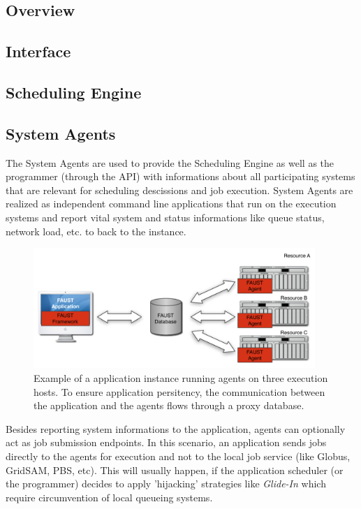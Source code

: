 \subsection{Overview}

\subsection{Interface}

\subsection{Scheduling Engine}

\subsection{System Agents}

The System Agents are used to provide the Scheduling Engine as well as the programmer (through the API) with informations about all participating systems that are relevant for scheduling descissions and job execution. \FAUST System Agents are realized as independent command line applications that run on the execution systems and report vital system and status informations like queue status, network load, etc. to back to the \FAUST instance.

\begin{figure}[bth!]
  \begin{center}
    \includegraphics[width=0.95\textwidth]{figures/faust_agents_01}
    \caption{\label{fig:faust_agents_01} Example of a \FAUST application 
      instance running agents on three execution hosts. To ensure 
      application persitency, the communication between the application
      and the agents flows through a proxy database. }
  \end{center}
\end{figure}

Besides reporting system informations to the application, agents can optionally act as job submission endpoints. In this scenario, an application sends jobs directly to the agents for execution and not to the local job service (like Globus, GridSAM, PBS, etc). This will usually happen, if the application scheduler (or the programmer) decides to apply 'hijacking' strategies like \textit{Glide-In} which require circumvention of local queueing systems.


